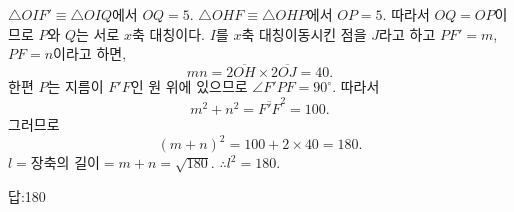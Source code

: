 \documentclass{article}
\begin{document}
\(\triangle OIF'\equiv\triangle OIQ\)에서 \(OQ=5\).
\(\triangle OHF\equiv\triangle OHP\)에서 \(OP=5\).
따라서 \(OQ=OP\)이므로 \(P\)와 \(Q\)는 서로 \(x\)축 대칭이다.
\(I\)를 \(x\)축 대칭이동시킨 점을 \(J\)라고 하고 \(PF'=m\), \(PF=n\)이라고 하면,
\[mn=2\overline{OH}\times2\overline{OJ}=40.\]
한편 \(P\)는 지름이 \(F'F\)인 원 위에 있으므로 \(\angle F'PF=90^\circ\).
따라서
\[m^2+n^2=\overline{F'F}^2=100.\]
그러므로
\[(m+n)^2=100+2\times 40=180.\]
\(l=\text{장축의 길이}=m+n=\sqrt{180}\).
\(\therefore l^2=180.\)


\begin{mdframed}[leftmargin=0.91\textwidth,innerleftmargin=5pt]
답:180
\end{mdframed}
\end{document}
